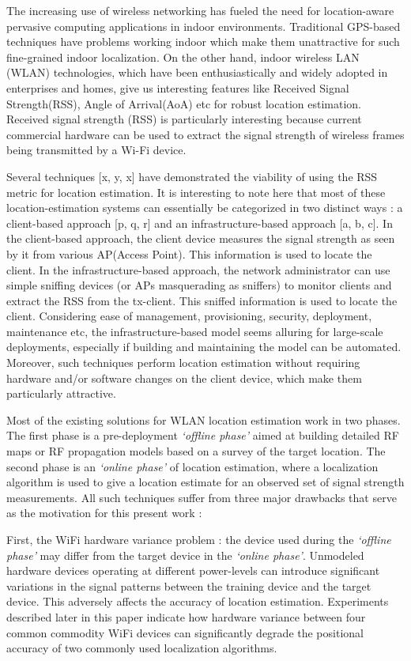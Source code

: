 \documentclass{Localization-PaperWriteupDraft}
\begin{document}
The increasing use of wireless networking has fueled the need for location-aware pervasive computing applications in indoor environments. Traditional GPS-based techniques have problems working indoor which make them unattractive for such fine-grained indoor localization. On the other hand, indoor wireless LAN (WLAN) technologies, which have been enthusiastically and widely adopted in enterprises and homes, give us interesting features like Received Signal Strength(RSS), Angle of Arrival(AoA) etc for robust location estimation. Received signal strength (RSS) is particularly interesting because current commercial hardware can be used to extract the signal strength of wireless frames being transmitted by a Wi-Fi device. 

Several techniques [x, y, x] have demonstrated the viability of using the RSS metric for location estimation.   It is interesting to note here that most of these location-estimation systems can essentially be categorized in two distinct ways : a client-based approach [p, q, r] and an infrastructure-based approach [a, b, c]. In the client-based approach, the client device measures the signal strength as seen by it from various AP(Access Point). This information is used to locate the client. In the infrastructure-based approach, the network administrator can use simple sniffing devices (or APs masquerading as sniffers) to monitor clients and extract the RSS from the tx-client.  This sniffed information is used to locate the client. Considering ease of management, provisioning, security, deployment,  maintenance etc, the infrastructure-based model seems alluring for large-scale deployments, especially if building and maintaining the model can be automated. Moreover, such techniques perform location estimation without requiring hardware and/or software changes on the client device, which make them particularly attractive.

Most of the existing solutions for WLAN location estimation work in two phases. The first phase is a pre-deployment {\it `offline phase'} aimed at building detailed RF maps or RF propagation models based on a survey of the target location. The second phase is an {\it `online phase'} of location estimation, where a localization algorithm is used to give a location estimate for an observed set of signal strength measurements. All such techniques suffer from three major drawbacks that serve as the motivation for this present work :

First, the WiFi hardware variance problem : the device used during the {\it `offline phase'} may differ from the target device in the {\it `online phase'}. Unmodeled hardware devices operating at different power-levels can introduce significant variations in the signal patterns between the training device and the target device. This adversely affects the accuracy of location estimation. Experiments described later in this paper indicate how hardware variance between four common commodity WiFi devices can significantly degrade the positional accuracy of two commonly used localization algorithms. 
\end{document}
